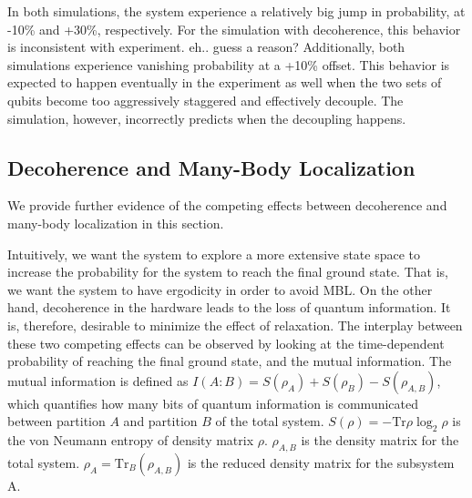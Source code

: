 \documentclass[prd,twocolumn,tightenlines,preprintnumbers,showpacs,superscriptaddress,notitlepage,nofootinbib,eqsecnum,floatfix,longbibliography]{revtex4}
\begin{document}
In both simulations, the system experience a relatively big jump in probability, at -10\% and +30\%, respectively.
For the simulation with decoherence, this behavior is inconsistent with experiment.
{\color{red} eh..
guess a reason?} Additionally, both simulations experience vanishing probability at a +10\% offset.
This behavior is expected to happen eventually in the experiment as well when the two sets of qubits become too aggressively staggered and effectively decouple.
The simulation, however, incorrectly predicts when the decoupling happens.

\subsection{Decoherence and Many-Body Localization}

We provide further evidence of the competing effects between decoherence and many-body localization in this section.

Intuitively, we want the system to explore a more extensive state space to increase the probability for the system to reach the final ground state.
That is, we want the system to have ergodicity in order to avoid MBL.
On the other hand, decoherence in the hardware leads to the loss of quantum information.
It is, therefore, desirable to minimize the effect of relaxation.
The interplay between these two competing effects can be observed by looking at the time-dependent probability of reaching the final ground state, and the mutual information.
The mutual information is defined as $I(A:B)=S(\rho_A)+S(\rho_B)-S(\rho_{A,B})$, which quantifies how many bits of quantum information is communicated between partition $A$ and partition $B$ of the total system.
$S(\rho)=-\mbox{Tr}\rho \log_2 \rho$ is the von Neumann entropy of density matrix $\rho$.
{\color{blue} $\rho_{A,B}$ is the density matrix for the total system.
$\rho_{A}=\mbox{Tr}_{B} (\rho_{A,B})$ is the reduced density matrix for the subsystem A.}
\end{document}
